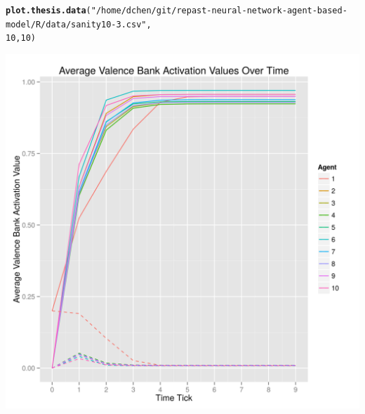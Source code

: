 \documentclass{article}\usepackage[]{graphicx}\usepackage[]{color}
\makeatletter
\def\maxwidth{ %
  \ifdim\Gin@nat@width>\linewidth
    \linewidth
  \else
    \Gin@nat@width
  \fi
}
\newcommand{\hlnum}[1]{\textcolor[rgb]{0.686,0.059,0.569}{#1}}%
\newcommand{\hlstr}[1]{\textcolor[rgb]{0.192,0.494,0.8}{#1}}%
\newcommand{\hlstd}[1]{\textcolor[rgb]{0.345,0.345,0.345}{#1}}%
\newcommand{\hlkwd}[1]{\textcolor[rgb]{0.737,0.353,0.396}{\textbf{#1}}}%
\newenvironment{kframe}{%
 \def\at@end@of@kframe{}%
 \ifinner\ifhmode%
  \def\at@end@of@kframe{\end{minipage}}%
  \begin{minipage}{\columnwidth}%
 \fi\fi%
 \def\FrameCommand##1{\hskip\@totalleftmargin \hskip-\fboxsep
 \colorbox{shadecolor}{##1}\hskip-\fboxsep
     \hskip-\linewidth \hskip-\@totalleftmargin \hskip\columnwidth}%
 \MakeFramed {\advance\hsize-\width
   \@totalleftmargin\z@ \linewidth\hsize
   \@setminipage}}%
 {\par\unskip\endMakeFramed%
 \at@end@of@kframe}
\newenvironment{knitrout}{}{} %
\makeatother
\begin{document}
\newpage
\begin{knitrout}
\color{fgcolor}\begin{kframe}
\begin{alltt}
\hlkwd{plot.thesis.data}\hlstd{(}\hlstr{"/home/dchen/git/repast-neural-network-agent-based-model/R/data/sanity10-3.csv"}\hlstd{,}
    \hlnum{10}\hlstd{,} \hlnum{10}\hlstd{)}
\end{alltt}
\end{kframe}
\includegraphics[width=\maxwidth]{figure/unnamed-chunk-3} 

\end{knitrout}
\end{document}
